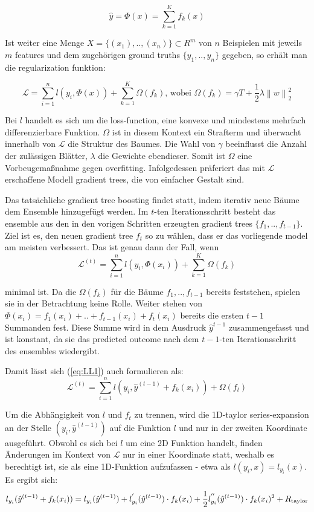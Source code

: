 \documentclass[a4paper,12pt]{scrartcl}
\newcommand{\LL}{\ensuremath{\mathcal{L}}}
\newcommand{\norm}[1]{\left\| #1 \right\|}
\begin{document}
 $$\hat{y} = \Phi(x) = \sum_{k=1}^{K} f_k(x)$$

Ist weiter eine Menge $X= \{(x_1), .. ,(x_n)\} \subset R^{m} $ von $n$ Beispielen mit jeweils $m$ features und dem zugehörigen ground truths $\{y_1, .. ,y_n\}$ gegeben, so erhält man die regularization funktion:

$$\mathcal{L} = \sum_{i=1}^{n} l(y_i, \Phi(x)) + \sum_{k=1}^{K}\Omega(f_k) \text{,  wobei } \Omega(f_k) = \gamma T + \frac{1}{2}\lambda \norm{w}_2^2$$

Bei $l$ handelt es sich um die loss-function, eine konvexe und mindestens mehrfach differenzierbare Funktion. $\Omega$ ist in diesem Kontext ein Strafterm und überwacht innerhalb von $\LL$ die Struktur des Baumes. Die Wahl von $\gamma$ beeinflusst die Anzahl der zulässigen Blätter, $\lambda$ die Gewichte ebendieser. Somit ist $\Omega$ eine Vorbeugemaßnahme gegen overfitting. Infolgedessen präferiert das mit $\LL$ erschaffene Modell gradient trees, die von einfacher Gestalt sind.


Das tatsächliche gradient tree boosting findet statt, indem iterativ neue Bäume dem Ensemble hinzugefügt werden. Im $t$-ten Iterationsschritt besteht das ensemble aus den in den vorigen Schritten erzeugten gradient trees $\{f_1, .. , f_{t-1}\}$. Ziel ist es, den neuen gradient tree $f_t$ so zu wählen, dass er das vorliegende model am meisten verbessert. Das ist genau dann der Fall, wenn
\begin{equation}
	\LL^{(t)} = \sum_{i=1}^{n} l(y_i, \Phi(x_i)) + \sum_{k=1}^{K}\Omega(f_k)
	\label{eq:LL1}
\end{equation}

minimal ist. Da die $\Omega(f_k)$ für die Bäume $f_1, .. , f_{t-1}$ bereits feststehen, spielen sie in der Betrachtung keine Rolle. Weiter stehen von $\Phi(x_i) = f_1(x_i) + .. + f_{t-1}(x_i) + f_t(x_i)$ bereits die ersten $t-1$ Summanden fest. Diese Summe wird in dem Ausdruck $\hat{y}^{t-1}$ zusammengefasst und ist konstant, da sie das predicted outcome nach dem $t-1$-ten Iterationsschritt des ensembles wiedergibt.

Damit lässt sich (\ref{eq:LL1}) auch formulieren als:
\begin{equation}
    \LL^{(t)} = \sum_{i=1}^{n} l(y_i, \hat{y}^{(t-1)} + f_k(x_i)) + \Omega(f_t)
    \label{eq:LL2}
\end{equation}

Um die Abhängigkeit von $l$ und $f_t$ zu trennen, wird die 1D-taylor series-expansion an der Stelle $(y_i,\hat{y}^{(t-1)})$ auf die Funktion $l$ und nur in der zweiten Koordinate ausgeführt. Obwohl es sich bei $l$ um eine 2D Funktion handelt, finden Änderungen im Kontext von $\LL$ nur in einer Koordinate statt, weshalb es berechtigt ist, sie als eine 1D-Funktion aufzufassen - etwa als $l(y_i,x) = l_{y_i}(x)$. Es ergibt sich:
\begin{equation}
l_{y_i}(\hat{y}^{(t-1)} + f_k(x_i)) = l_{y_i}(\hat{y}^{(t-1)}) + l_{y_i}^{'}(\hat{y}^{(t-1)}) \cdot f_k(x_i)
+ \newline \frac{1}{2} l_{y_i}^{''}(\hat{y}^{(t-1)}) \cdot f_k(x_i)^2 + R_\text{taylor}
\end{equation}
\end{document}
